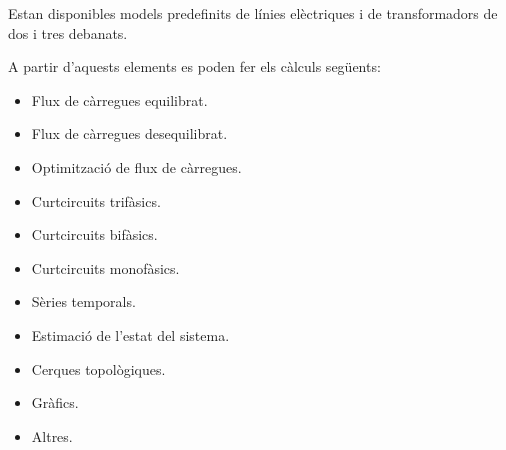 Estan disponibles models predefinits de línies elèctriques i de transformadors de dos i tres debanats.

A partir d'aquests elements  es poden fer els càlculs següents:
\begin{itemize}
	\item Flux de càrregues equilibrat.
	\item Flux de càrregues desequilibrat.
	\item Optimització de flux de càrregues.
	\item Curtcircuits trifàsics.
	\item Curtcircuits bifàsics.
	\item Curtcircuits monofàsics.
	\item Sèries temporals.
	\item Estimació de l'estat del sistema.
	\item Cerques topològiques.
	\item Gràfics.
	\item Altres.
\end{itemize}

